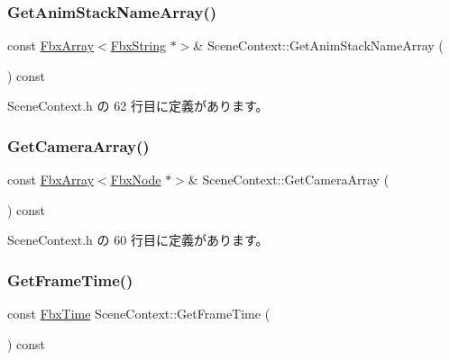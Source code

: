 \subsubsection{\texorpdfstring{Get\+Anim\+Stack\+Name\+Array()}{GetAnimStackNameArray()}}
{\footnotesize\ttfamily const \hyperlink{class_fbx_array}{Fbx\+Array}$<$\hyperlink{class_fbx_string}{Fbx\+String} $\ast$$>$\& Scene\+Context\+::\+Get\+Anim\+Stack\+Name\+Array (\begin{DoxyParamCaption}{ }\end{DoxyParamCaption}) const\hspace{0.3cm}{\ttfamily [inline]}}



 Scene\+Context.\+h の 62 行目に定義があります。

\mbox{\label{class_scene_context_af91e35c678853d0656e17df1ed164a19}} 
\subsubsection{\texorpdfstring{Get\+Camera\+Array()}{GetCameraArray()}}
{\footnotesize\ttfamily const \hyperlink{class_fbx_array}{Fbx\+Array}$<$\hyperlink{class_fbx_node}{Fbx\+Node} $\ast$$>$\& Scene\+Context\+::\+Get\+Camera\+Array (\begin{DoxyParamCaption}{ }\end{DoxyParamCaption}) const\hspace{0.3cm}{\ttfamily [inline]}}



 Scene\+Context.\+h の 60 行目に定義があります。

\mbox{\label{class_scene_context_a0a8ec2998e945ddf669ad263759e14d4}} 
\subsubsection{\texorpdfstring{Get\+Frame\+Time()}{GetFrameTime()}}
{\footnotesize\ttfamily const \hyperlink{class_fbx_time}{Fbx\+Time} Scene\+Context\+::\+Get\+Frame\+Time (\begin{DoxyParamCaption}{ }\end{DoxyParamCaption}) const\hspace{0.3cm}{\ttfamily [inline]}}



